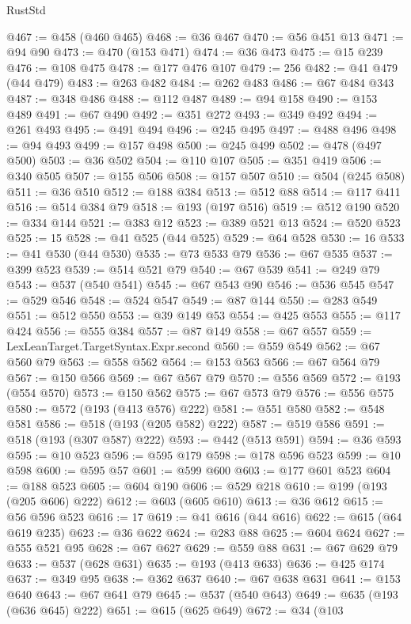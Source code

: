 \begin{lexlean}{RustStd}
\begin{coremodule}
@467 := @458 (@460 @465)
@468 := @36 @467
@470 := @56 @451 @13
@471 := @94 @90
@473 := @470 (@153 @471)
@474 := @36 @473
@475 := @15 @239
@476 := @108 @475
@478 := @177 @476 @107
@479 := 256
@482 := @41 @479 (@44 @479)
@483 := @263 @482
@484 := @262 @483
@486 := @67 @484 @343
@487 := @348 @486
@488 := @112 @487
@489 := @94 @158
@490 := @153 @489
@491 := @67 @490
@492 := @351 @272
@493 := @349 @492
@494 := @261 @493
@495 := @491 @494
@496 := @245 @495
@497 := @488 @496
@498 := @94 @493
@499 := @157 @498
@500 := @245 @499
@502 := @478 (@497 @500)
@503 := @36 @502
@504 := @110 @107
@505 := @351 @419
@506 := @340 @505
@507 := @155 @506
@508 := @157 @507
@510 := @504 (@245 @508)
@511 := @36 @510
@512 := @188 @384
@513 := @512 @88
@514 := @117 @411
@516 := @514 @384 @79
@518 := @193 (@197 @516)
@519 := @512 @190
@520 := @334 @144
@521 := @383 @12
@523 := @389 @521 @13
@524 := @520 @523
@525 := 15
@528 := @41 @525 (@44 @525)
@529 := @64 @528
@530 := 16
@533 := @41 @530 (@44 @530)
@535 := @73 @533 @79
@536 := @67 @535
@537 := @399 @523
@539 := @514 @521 @79
@540 := @67 @539
@541 := @249 @79
@543 := @537 (@540 @541)
@545 := @67 @543 @90
@546 := @536 @545
@547 := @529 @546
@548 := @524 @547
@549 := @87 @144
@550 := @283 @549
@551 := @512 @550
@553 := @39 @149 @53
@554 := @425 @553
@555 := @117 @424
@556 := @555 @384
@557 := @87 @149
@558 := @67 @557
@559 := LexLeanTarget.TargetSyntax.Expr.second
@560 := @559 @549
@562 := @67 @560 @79
@563 := @558 @562
@564 := @153 @563
@566 := @67 @564 @79
@567 := @150 @566
@569 := @67 @567 @79
@570 := @556 @569
@572 := @193 (@554 @570)
@573 := @150 @562
@575 := @67 @573 @79
@576 := @556 @575
@580 := @572 (@193 (@413 @576) @222)
@581 := @551 @580
@582 := @548 @581
@586 := @518 (@193 (@205 @582) @222)
@587 := @519 @586
@591 := @518 (@193 (@307 @587) @222)
@593 := @442 (@513 @591)
@594 := @36 @593
@595 := @10 @523
@596 := @595 @179
@598 := @178 @596 @523
@599 := @10 @598
@600 := @595 @57
@601 := @599 @600
@603 := @177 @601 @523
@604 := @188 @523
@605 := @604 @190
@606 := @529 @218
@610 := @199 (@193 (@205 @606) @222)
@612 := @603 (@605 @610)
@613 := @36 @612
@615 := @56 @596 @523
@616 := 17
@619 := @41 @616 (@44 @616)
@622 := @615 (@64 @619 @235)
@623 := @36 @622
@624 := @283 @88
@625 := @604 @624
@627 := @555 @521 @95
@628 := @67 @627
@629 := @559 @88
@631 := @67 @629 @79
@633 := @537 (@628 @631)
@635 := @193 (@413 @633)
@636 := @425 @174
@637 := @349 @95
@638 := @362 @637
@640 := @67 @638 @631
@641 := @153 @640
@643 := @67 @641 @79
@645 := @537 (@540 @643)
@649 := @635 (@193 (@636 @645) @222)
@651 := @615 (@625 @649)
@672 := @34
    (@103

\end{coremodule}
\end{lexlean}
